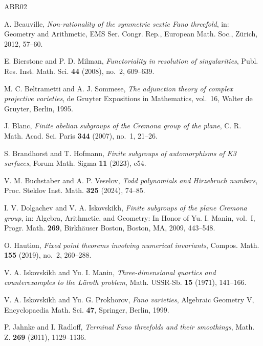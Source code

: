 \documentclass[10pt,oneside,reqno]{amsart}
\numberwithin{equation}{section}
\theoremstyle{definition}
\begin{document}
\begin{thebibliography}{ABR02}

A. Beauville,
\emph{Non-rationality of the symmetric sextic Fano threefold},
in: Geometry and Arithmetic, EMS Ser. Congr. Rep.,
European Math. Soc., Z\"urich, 2012, 57--60.

E. Bierstone and P. D. Milman,
\emph{Functoriality in resolution of singularities},
Publ. Res. Inst. Math. Sci. \textbf{44} (2008), no.~2, 609--639.

M. C. Beltrametti and A. J. Sommese,
\emph{The adjunction theory of complex projective varieties},
de Gruyter Expositions in Mathematics, vol.~16,
Walter de Gruyter, Berlin, 1995.

J. Blanc,
\emph{Finite abelian subgroups of the Cremona group of the plane},
C. R. Math. Acad. Sci. Paris \textbf{344} (2007), no.~1, 21--26.

S. Brandhorst and T. Hofmann,
\emph{Finite subgroups of automorphisms of K3 surfaces},
Forum Math. Sigma \textbf{11} (2023), e54.

V. M. Buchstaber and A. P. Veselov,
\emph{Todd polynomials and Hirzebruch numbers},
Proc. Steklov Inst. Math. \textbf{325} (2024), 74--85.



I. V. Dolgachev and V. A. Iskovskikh,
\emph{Finite subgroups of the plane Cremona group},
in: Algebra, Arithmetic, and Geometry: In Honor of Yu. I. Manin,
vol.~I, Progr. Math. \textbf{269}, Birkh\"auser Boston, Boston, MA,
2009, 443--548.

O. Haution,
\emph{Fixed point theorems involving numerical invariants},
Compos. Math. \textbf{155} (2019), no.~2, 260--288.


V. A. Iskovskikh and Yu. I. Manin,
\emph{Three-dimensional quartics and counterexamples to the L\"uroth
problem},
Math. USSR-Sb. \textbf{15} (1971), 141--166.

V. A. Iskovskikh and Yu. G. Prokhorov,
\emph{Fano varieties},
Algebraic Geometry V, Encyclopaedia Math. Sci. \textbf{47},
Springer, Berlin, 1999.

P. Jahnke and I. Radloff,
\emph{Terminal Fano threefolds and their smoothings},
Math. Z. \textbf{269} (2011), 1129--1136.


\end{thebibliography}
\end{document}
